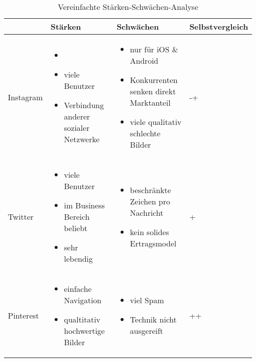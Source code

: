 \begin{center}
	\begin{table}[htbp!]
	\centering
		\begin{tabular}{| M{2cm} | M{5cm} | M{5cm} | M{3cm} |}
		\hline
			\textbf{ } & \textbf{Stärken} & \textbf{Schwächen} & \textbf{Selbstvergleich} \\ \hline
			Instagram 
			& \begin{itemize}
				\item[]
				\item viele Benutzer
				\item Verbindung anderer sozialer Netzwerke
			\end{itemize}
			& \begin{itemize}
				\item nur für iOS \& Android
				\item Konkurrenten senken direkt Marktanteil
				\item viele qualitativ schlechte Bilder
			\end{itemize} 
			& -+
			\\ \hline
			
			Twitter 
			& \begin{itemize}
				\item viele Benutzer
				\item im Business Bereich beliebt
				\item sehr lebendig
			\end{itemize}
			& \begin{itemize}
				\item beschränkte Zeichen pro Nachricht
				\item kein solides Ertragsmodel
			\end{itemize} 
			& +
			\\ \hline
			
			Pinterest 
			& \begin{itemize}
				\item einfache Navigation
				\item qualtitativ hochwertige Bilder
			\end{itemize}
			& \begin{itemize}
				\item viel Spam
				\item Technik nicht ausgereift
			\end{itemize} 
			& ++
			\\ \hline
		\end{tabular}
		\caption{Vereinfachte Stärken-Schwächen-Analyse}
		\label{table:simpleSwot}
	\end{table}
\end{center}